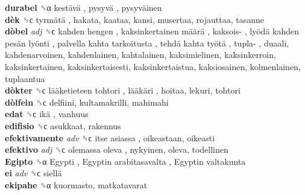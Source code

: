 \textbf{durabel} ␝α   kestävä ,  pysyvä ,  pysyväinen   \\
\textbf{dèk} ␝ϲ   tyrmätä , hakata, kaataa, kansi, musertaa, rojauttaa, tasanne  \\
\textbf{dòbel} \emph{adj}  ␝ϲ   kahden hengen ,  kaksinkertainen määrä ,  kaksois- ,  lyödä kahden pesän lyönti ,  palvella kahta tarkoitusta ,  tehdä kahta työtä ,  tupla- , duaali, kahdenarvoinen, kahdenlainen, kahtalainen, kaksimielinen, kaksinkerroin, kaksinkertainen, kaksinkertaisesti, kaksinkertaistua, kaksiosainen, kolmenlainen, tuplaantua  \\
\textbf{dòkter} ␝ϲ   lääketieteen tohtori ,  lääkäri , hoitaa, lekuri, tohtori  \\
\textbf{dòlfein} ␝ϲ  delfiini, kultamakrilli, mahimahi  \\
\textbf{edat} ␝ϲ   ikä , vanhuus  \\
\textbf{edifisio} ␝ϲ  asukkaat, rakennus  \\
\textbf{efektivamente} \emph{adv}  ␝ϲ   itse asiassa , oikeastaan, oikeasti  \\
\textbf{efektivo} \emph{adj}  ␝ϲ   olemassa oleva , nykyinen, oleva, todellinen  \\
\textbf{Egipto} ␝α   Egypti ,  Egyptin arabitasavalta ,  Egyptin valtakunta   \\
\textbf{ei} \emph{adv}  ␝ϲ   siellä   \\
\textbf{ekipahe} ␝α  kuormasto, matkatavarat  \\
